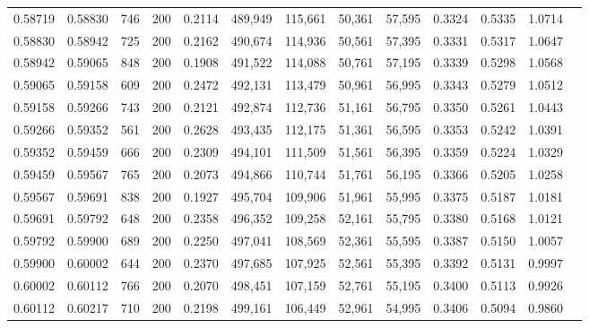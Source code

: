 \begin{tabular}{rrrrrrrrrrrrr}
0.58719 & 0.58830 &    746 & 200 &                                     0.2114 & 489,949 & 115,661 &  50,361 &  57,595 & 0.3324 & 0.5335 & 1.0714 \\
0.58830 & 0.58942 &    725 & 200 &                                     0.2162 & 490,674 & 114,936 &  50,561 &  57,395 & 0.3331 & 0.5317 & 1.0647 \\
0.58942 & 0.59065 &    848 & 200 &                                     0.1908 & 491,522 & 114,088 &  50,761 &  57,195 & 0.3339 & 0.5298 & 1.0568 \\
0.59065 & 0.59158 &    609 & 200 &                                     0.2472 & 492,131 & 113,479 &  50,961 &  56,995 & 0.3343 & 0.5279 & 1.0512 \\
0.59158 & 0.59266 &    743 & 200 &                                     0.2121 & 492,874 & 112,736 &  51,161 &  56,795 & 0.3350 & 0.5261 & 1.0443 \\
0.59266 & 0.59352 &    561 & 200 &                                     0.2628 & 493,435 & 112,175 &  51,361 &  56,595 & 0.3353 & 0.5242 & 1.0391 \\
0.59352 & 0.59459 &    666 & 200 &                                     0.2309 & 494,101 & 111,509 &  51,561 &  56,395 & 0.3359 & 0.5224 & 1.0329 \\
0.59459 & 0.59567 &    765 & 200 &                                     0.2073 & 494,866 & 110,744 &  51,761 &  56,195 & 0.3366 & 0.5205 & 1.0258 \\
0.59567 & 0.59691 &    838 & 200 &                                     0.1927 & 495,704 & 109,906 &  51,961 &  55,995 & 0.3375 & 0.5187 & 1.0181 \\
0.59691 & 0.59792 &    648 & 200 &                                     0.2358 & 496,352 & 109,258 &  52,161 &  55,795 & 0.3380 & 0.5168 & 1.0121 \\
0.59792 & 0.59900 &    689 & 200 &                                     0.2250 & 497,041 & 108,569 &  52,361 &  55,595 & 0.3387 & 0.5150 & 1.0057 \\
0.59900 & 0.60002 &    644 & 200 &                                     0.2370 & 497,685 & 107,925 &  52,561 &  55,395 & 0.3392 & 0.5131 & 0.9997 \\
0.60002 & 0.60112 &    766 & 200 &                                     0.2070 & 498,451 & 107,159 &  52,761 &  55,195 & 0.3400 & 0.5113 & 0.9926 \\
0.60112 & 0.60217 &    710 & 200 &                                     0.2198 & 499,161 & 106,449 &  52,961 &  54,995 & 0.3406 & 0.5094 & 0.9860 \\

\end{tabular}
